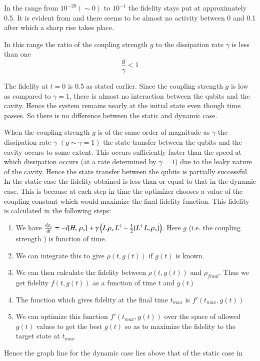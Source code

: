 In the range from ${10}^{-20}\left(\sim 0\right)$ to ${10 }^{-1}$ the fidelity stays put  at approximately 0.5. It  is evident from  and  there seems to be almost no activity between 0 and 0.1 after which a sharp rise takes place. 

 In this range the ratio of the coupling strength $g$ to the dissipation rate $\gamma$ is less than one \[\frac {g}{\gamma}<1\]

The fidelity at $t=0$ is 0.5 as stated earlier. Since the coupling strength $g$ is low as compared to $\gamma = 1$, there is almost no interaction between the qubits and the cavity. Hence the system remains nearly at the initial state even though time passes. So there is no difference between the static and dynamic case. 

When the coupling strength $g$ is of the same order of magnitude as $\gamma$ the dissipation rate $\gamma$ $({g}\sim{\gamma}=1)$ the state transfer between the qubits and the cavity occurs to some extent. This occurs sufficiently faster than the speed at which dissipation occurs (at a rate determined by $\gamma=1$) due to the leaky nature of the cavity. Hence the state transfer between the qubits is partially successful. In the static case the fidelity obtained is less than or equal to that in the dynamic case. This is because at each step in time the optimizer chooses a value of the coupling constant which  would maximize the final fidelity function. This fidelity is calculated in the following steps: 


\begin{enumerate}
\item We have $\frac {{d\rho}_{s}}{dt} = -{i} [{ H },\thinspace { \rho  }_{ s }] +\gamma \left({ { L }\thinspace{ \rho}_{ s } }\thinspace { L }^{ \dagger  }-\frac { 1 }{ 2 } \{ { L }^{ \dagger}\thinspace{L},{\rho  }_{ s }\}\right)$. Here $g$ (i.e. the coupling strength ) is function of time.
\item We can integrate this to give $\rho\left({t,g{(t)}}\right)$ if  $g{(t)} $ is known.
\item We can then calculate the fidelity between $\rho\left({t,g{(t)}}\right)$ and $\rho_{final}$. Thus we get fidelity $f\left({t,g{(t)}}\right)$ as a function of time $t$ and $g{(t)}$
\item The function which gives fidelity at the final time $t_{max}$ is $f'\left(t_{max}, g{(t)}\right)$
\item We can optimize this function $f'\left(t_{max}, g{(t)}\right)$ over the space of allowed $g(t)$ values to get the best $g{(t)}$ so as to maximize the fidelity to the target state at $t_{max}$
\end{enumerate} 
 Hence the graph line for the dynamic case lies above that of the static case in 
 
